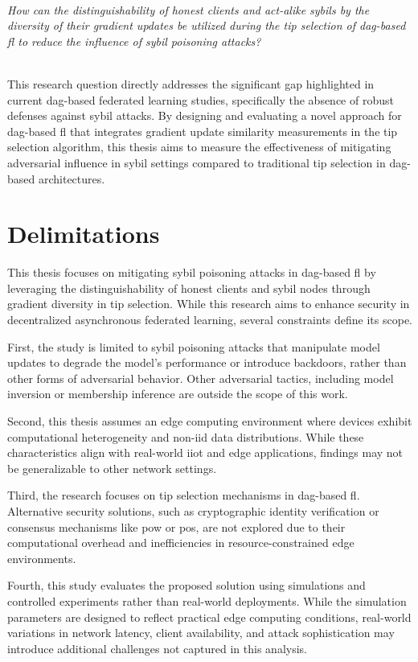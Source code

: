 \noindent\hrulefill\\
\noindent\textit{How can the distinguishability of honest clients and act-alike sybils by the diversity of their gradient updates be utilized during the tip selection of \ac{dag}-based \ac{fl} to reduce the influence of sybil poisoning attacks?}

\noindent\hrulefill\\
This research question directly addresses the significant gap highlighted in current \ac{dag}-based federated learning studies, specifically the absence of robust defenses against sybil attacks. By designing and evaluating a novel approach for \ac{dag}-based \ac{fl} that integrates gradient update similarity measurements in the tip selection algorithm, this thesis aims to measure the effectiveness of mitigating adversarial influence in sybil settings compared to traditional tip selection in \ac{dag}-based architectures.

\pagebreak
\section{Delimitations}
This thesis focuses on mitigating sybil poisoning attacks in \ac{dag}-based \ac{fl} by leveraging the distinguishability of honest clients and sybil nodes through gradient diversity in tip selection. While this research aims to enhance security in decentralized asynchronous federated learning, several constraints define its scope.

First, the study is limited to sybil poisoning attacks that manipulate model updates to degrade the model's performance or introduce backdoors, rather than other forms of adversarial behavior. Other adversarial tactics, including model inversion or membership inference are outside the scope of this work. 

Second, this thesis assumes an edge computing environment where devices exhibit computational heterogeneity and \ac{non-iid} data distributions. While these characteristics align with real-world \ac{iiot} and edge applications, findings may not be generalizable to other network settings. 

Third, the research focuses on tip selection mechanisms in \ac{dag}-based \ac{fl}. Alternative security solutions, such as cryptographic identity verification or consensus mechanisms like \ac{pow} or \ac{pos}, are not explored due to their computational overhead and inefficiencies in resource-constrained edge environments. 

Fourth, this study evaluates the proposed solution using simulations and controlled experiments rather than real-world deployments. While the simulation parameters are designed to reflect practical edge computing conditions, real-world variations in network latency, client availability, and attack sophistication may introduce additional challenges not captured in this analysis. 

